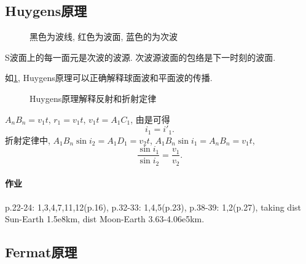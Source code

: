 \documentclass{ctexart}
\begin{document}

\subsection{Huygens原理} %
\label{sub:huygens原理}

\begin{figure}[ht]
    \centering
    \caption{黑色为波线, 红色为波面, 蓝色的为次波}
    \label{fig:Huygens原理示意}
\end{figure}
\begin{definition}
    S波面上的每一面元是次波的波源. 次波源波面的包络是下一时刻的波面.
\end{definition}
\begin{sample}
    \begin{ex}
        如\cref{fig:Huygens原理示意}, Huygens原理可以正确解释球面波和平面波的传播.
    \end{ex}
\end{sample}
\begin{figure}[ht]
    \centering
    \caption{Huygens原理解释反射和折射定律}
    \label{fig:Huygens反射折射示意}
\end{figure}
\begin{sample}
    \begin{ex}
        $A_nB_n = v_1 t$, $r_1 = v_1t$, $v_1t = A_1C_1$, 由是可得
        \[ i_1 = i'_1. \]
        折射定律中, $A_1B_n\sin i_2=A_1D_1 = v_2t$, $A_1B_n\sin i_1 = A_nB_n = v_1t$,
        \[ \frac{\sin i_1}{\sin i_2} = \frac{v_1}{v_2}. \]
    \end{ex}
\end{sample}
\paragraph{作业} %
\label{par:作业}

p.22-24: 1,3,4,7,11,12(p.16), p.32-33: 1,4,5(p.23), p.38-39: 1,2(p.27), taking dist Sun-Earth 1.5e8km, dist Moon-Earth 3.63-4.06e5km.



\subsection{Fermat原理} %
\label{sub:fermat原理}
\end{document}
